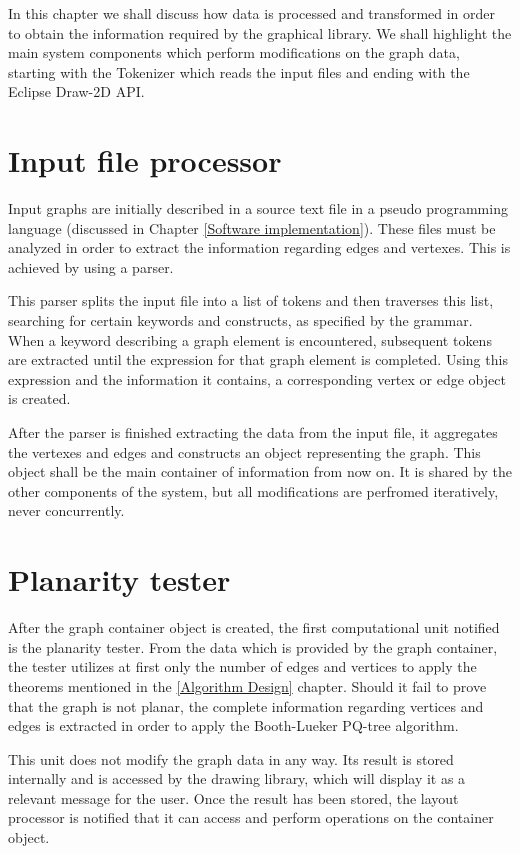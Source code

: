 In this chapter we shall discuss how data is processed and transformed in order to obtain 
the information required by the graphical library. We shall highlight the main system components 
which perform modifications on the graph data, starting with the Tokenizer which reads the input 
files and ending with the Eclipse Draw-2D API.

\section{Input file processor}

Input graphs are initially described in a source text file in a pseudo programming language (discussed in 
Chapter \ref{Software implementation}). These files must be analyzed in order to extract the information 
regarding edges and vertexes. This is achieved by using a parser.

This parser splits the input file into a list of tokens and then traverses this list, searching for certain 
keywords and constructs, as specified by the grammar. When a keyword describing a graph element is encountered, 
subsequent tokens are extracted until the expression for that graph element is completed. Using this expression 
and the information it contains, a corresponding vertex or edge object is created.

After the parser is finished extracting the data from the input file, it aggregates the vertexes and 
edges and constructs an object representing the graph. This object shall be the main container 
of information from now on. It is shared by the other components of the system, but all modifications are perfromed 
iteratively, never concurrently.

\section{Planarity tester}

After the graph container object is created, the first computational unit notified is the planarity tester. 
From the data which is provided by the graph container, the tester utilizes at first only the number of edges 
and vertices to apply the theorems mentioned in the \ref{Algorithm Design} chapter. Should it fail 
to prove that the graph is not planar, the complete information regarding vertices and edges is extracted 
in order to apply the Booth-Lueker PQ-tree algorithm.

This unit does not modify the graph data in any way. Its result is stored internally and is accessed by the 
drawing library, which will display it as a relevant message for the user. Once the result has been stored, 
the layout processor is notified that it can access and perform operations on the container object.


